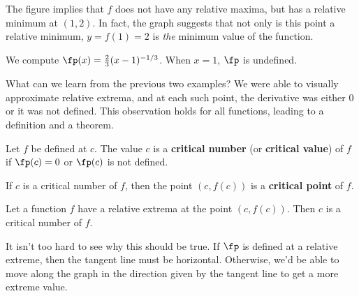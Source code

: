 {The figure implies that $f$ does not have any relative maxima, but has a relative minimum at $(1,2)$. In fact, the graph suggests that not only is this point a relative minimum, $y=f(1)=2$ is \textit{the} minimum value of the function.

We compute $\fp(x) = \frac23(x-1)^{-1/3}$. When $x=1$, $\fp$ is undefined.}

What can we learn from the previous two examples? We were able to visually approximate relative extrema, and at each such point, the derivative was either 0 or it was not defined. This observation holds for all functions, leading to a definition and a theorem.

%
{Let $f$ be defined at $c$. The value $c$ is a \textbf{critical number} (or \textbf{critical value}) of $f$ if $\fp(c)=0$ or $\fp(c)$ is not defined.\bigskip

If $c$ is a critical number of $f$, then the point $(c,f(c))$ is a \textbf{critical point} of $f$.}

{Let a function $f$ have a relative extrema at the point $(c,f(c))$. Then $c$ is a critical number of $f$.}%

It isn't too hard to see why this should be true.  If $\fp$ is defined at a relative extreme, then the tangent line must be horizontal.  Otherwise, we'd be able to move along the graph in the direction given by the tangent line to get a more extreme value.


